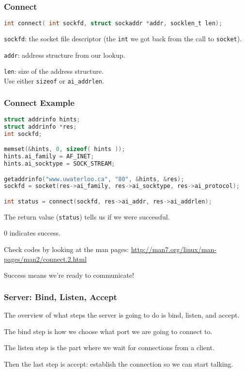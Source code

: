 \begin{frame}[fragile]
	\frametitle{Connect}

	\begin{lstlisting}[language=C]
int connect( int sockfd, struct sockaddr *addr, socklen_t len); 
\end{lstlisting}

	\texttt{sockfd}: the socket file descriptor (the \texttt{int} we got back from the call to \texttt{socket}).

	\texttt{addr}: address structure from our lookup.

	\texttt{len}: size of the address structure. \\
	\quad Use either \texttt{sizeof} or \texttt{ai\_addrlen}.

\end{frame}


\begin{frame}[fragile]
	\frametitle{Connect Example}

	\begin{lstlisting}[language=C]
struct addrinfo hints;
struct addrinfo *res;
int sockfd;

memset(&hints, 0, sizeof( hints ));
hints.ai_family = AF_INET;
hints.ai_socktype = SOCK_STREAM;

getaddrinfo("www.uwaterloo.ca", "80", &hints, &res);
sockfd = socket(res->ai_family, res->ai_socktype, res->ai_protocol);

int status = connect(sockfd, res->ai_addr, res->ai_addrlen);
\end{lstlisting}

	The return value (\texttt{status}) tells us if we were successful.

	0 indicates success.

	Check codes by looking at the man pages: \url{http://man7.org/linux/man-pages/man2/connect.2.html}

	Success means we're ready to communicate!

\end{frame}




\begin{frame}
	\frametitle{Server: Bind, Listen, Accept}


	The overview of what steps the server is going to do is bind, listen, and accept.

	The bind step is how we choose what port we are going to connect to.

	The listen step is the part where we wait for connections from a client.

	Then the last step is accept: establish the connection so we can start talking.

\end{frame}


